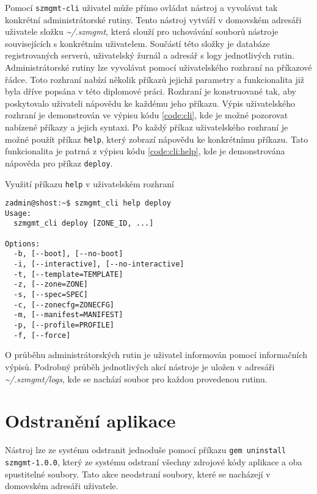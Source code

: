 Pomocí \texttt{szmgmt-cli} uživatel může přímo ovládat nástroj a vyvolávat tak konkrétní administrátorské rutiny. Tento nástroj
vytváří v domovském adresáři uživatele složku \textit{\textasciitilde/.szmgmt}, která slouží pro uchovávání souborů nástroje
souvisejících s konkrétním uživatelem. Součástí této složky je databáze registrovaných serverů, uživatelský žurnál a adresář
s logy jednotlivých rutin. Administrátorské rutiny lze vyvolávat pomocí uživatelského rozhraní na příkazové řádce. Toto rozhraní
nabízí několik příkazů jejichž parametry a funkcionalita již byla dříve popsána v této diplomové práci. Rozhraní je konstruované
tak, aby poskytovalo uživateli nápovědu ke každému jeho příkazu. Výpis uživatelského rozhraní je demonstrován ve výpisu kódu
\ref{code:cli}, kde je možné pozorovat nabízené příkazy a jejich syntaxi. Po každý příkaz uživatelského rozhraní je možné použít
příkaz \texttt{help}, který zobrazí nápovědu ke konkrétnímu příkazu. Tato funkcionalita je patrná z výpisu kódu \ref{code:cli:help},
kde je demonstrována nápověda pro příkaz \texttt{deploy}.
\begin{listing} 
 \caption{Využití příkazu \texttt{help} v uživatelském rozhraní}
 \begin{verbatim}
zadmin@shost:~$ szmgmt_cli help deploy
Usage:
  szmgmt_cli deploy [ZONE_ID, ...]

Options:
  -b, [--boot], [--no-boot]      
  -i, [--interactive], [--no-interactive]
  -t, [--template=TEMPLATE]
  -z, [--zone=ZONE]
  -s, [--spec=SPEC]
  -c, [--zonecfg=ZONECFG]
  -m, [--manifest=MANIFEST]
  -p, [--profile=PROFILE]
  -f, [--force]
 \end{verbatim}
 \label{code:cli:help}
\end{listing}
O průběhu administrátorských rutin je uživatel informován pomocí informačních výpisů. Podrobný průběh jednotlivých akcí nástroje
je uložen v adresáři \textit{\textasciitilde/.szmgmt/logs}, kde se nachází soubor pro každou provedenou rutinu.
\section{Odstranění aplikace}
\label{appendix:installation:delete}
Nástroj lze ze systému odstranit jednoduše pomocí příkazu \texttt{gem uninstall szmgmt-1.0.0}, který ze systému odstraní všechny
zdrojové kódy aplikace a oba spustitelné soubory. Tato akce neodstraní soubory, které se nacházejí v domovském adresáři uživatele.